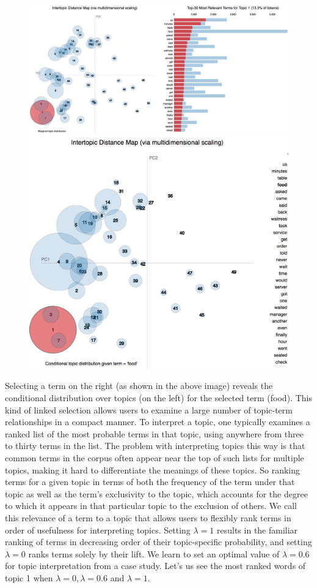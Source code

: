 \documentclass{neu_handout}
\begin{document}
\begin{figure}[h]
\centering
{
\includegraphics[width=0.5\linewidth]{second_image}
}
{
\includegraphics[width=0.3\linewidth]{third_image}
}
\end{figure}

Selecting a term on the right (as shown in the above image)  reveals the conditional distribution over topics (on the left) for the selected term (food). This kind of linked selection allows users to examine a large number of topic-term relationships in a compact manner.
To interpret a topic, one typically examines a ranked list of the most probable terms in that topic, using anywhere from three to thirty terms in the list. The problem with interpreting topics this way is that common terms in the corpus often appear near the top of such lists for multiple topics, making it hard to differentiate the meanings of these topics. So ranking terms for a given topic in terms of both the frequency of the term under that topic as well as the term’s exclusivity to the topic, which accounts for the degree to which it appears in that particular topic to the exclusion of others. We call this relevance of a term to a topic that allows users to flexibly rank terms in order of usefulness for interpreting topics. Setting $\lambda = 1$ results in the familiar ranking of terms in decreasing order of their topic-specific probability, and setting $\lambda = 0$ ranks terms solely by their lift. We learn to set an optimal value of $\lambda = 0.6$ for topic interpretation from a case study.
Let’s us see the most ranked words of topic 1 when $\lambda = 0, \lambda = 0.6$ and $\lambda = 1$.
\end{document}
